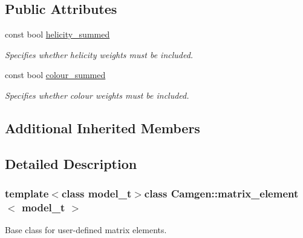 \subsection*{Public Attributes}
\begin{DoxyCompactItemize}
\item 
\hypertarget{a00359_af30076e3c819c11fe0bb3a83b67adec7}{const bool \hyperlink{a00359_af30076e3c819c11fe0bb3a83b67adec7}{helicity\-\_\-summed}}\label{a00359_af30076e3c819c11fe0bb3a83b67adec7}

\begin{DoxyCompactList}\small\item\em Specifies whether helicity weights must be included. \end{DoxyCompactList}\item 
\hypertarget{a00359_ada370a9920aa59784420f2874291123d}{const bool \hyperlink{a00359_ada370a9920aa59784420f2874291123d}{colour\-\_\-summed}}\label{a00359_ada370a9920aa59784420f2874291123d}

\begin{DoxyCompactList}\small\item\em Specifies whether colour weights must be included. \end{DoxyCompactList}\end{DoxyCompactItemize}
\subsection*{Additional Inherited Members}


\subsection{Detailed Description}
\subsubsection*{template$<$class model\-\_\-t$>$class Camgen\-::matrix\-\_\-element$<$ model\-\_\-t $>$}

Base class for user-\/defined matrix elements. 

